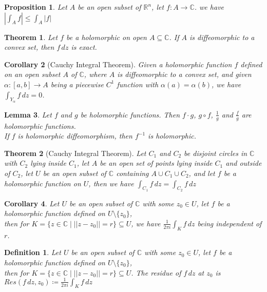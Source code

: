 \documentclass[9pt]{article}
\theoremstyle{break}
\theoremstyle{break}
\newtheorem{thm}{Theorem}[section]
\newtheorem{lem}{Lemma}[thm]
\newtheorem{prop}[lem]{Proposition}
\newtheorem{corT}[lem]{Corollary}
\newtheorem{defn}{Definition}[corL]
\newcommand{\R}{\mathbb{R}}
\newcommand{\Complex}{\mathbb{C}}
\begin{document}
\begin{prop}
Let $A$ be an open subset of $\R^n$, let $f:A \to \Complex$. we have $\left|\int_A f\right| \leq \int_A |f|$
\end{prop}

\begin{thm}
Let $f$ be a holomorphic on open $A\subseteq \Complex$. If $A$ is diffeomorphic to a convex set, then $f\, dz$ is exact.
\end{thm}

\begin{corT}[Cauchy Integral Theorem]
Given a holomorphic function $f$ defined on an open subset $A$ of $\Complex$, where $A$ is diffeomorphic to a convex set, and given $\alpha:[a,b] \to A$ being a piecewise $C^1$ function with $\alpha(a) = \alpha(b)$, we have $\int_{Y_\alpha} f\, dz = 0$.
\end{corT}

\begin{lem}
Let $f$ and $g$ be holomorphic functions. Then $f\cdot g$, $g\circ f$, $\frac{1}{g}$ and $\frac{f}{g}$ are holomorphic functions. \\
If $f$ is holomorphic diffeomorphism, then $f^{-1}$ is holomorphic.
\end{lem}

\begin{thm}[Cauchy Integral Theorem]
Let $C_1$ and $C_2$ be disjoint circles in $\Complex$ with $C_2$ lying inside $C_1$, let $A$ be an open set of points lying inside $C_1$ and outside of $C_2$, let $U$ be an open subset of $\Complex$ containing $A\cup C_1 \cup C_2$, and let $f$ be a holomorphic function on $U$, then we have $\int_{C_1} f \, dz = \int_{C_2} f\, dz$
\end{thm}

\begin{corT}
Let $U$ be an open subset of $\Complex$ with some $z_0 \in U$, let $f$ be a holomorphic function defined on $U\setminus \{z_0\}$, \\
then for $K = \{z \in \Complex \mid ||z - z_0|| = r\} \subseteq U$, we have $\frac{1}{2\pi i}\int_K f\, dz$ being independent of $r$. 
\end{corT}

\begin{defn}
Let $U$ be an open subset of $\Complex$ with some $z_0 \in U$, let $f$ be a holomorphic function defined on $U\setminus \{z_0\}$,\\ 
then for $K = \{z \in \Complex \mid ||z - z_0|| = r\} \subseteq U$. The residue of $f\, dz$ at $z_0$ is $Res(f\,dz, z_0)\coloneqq \frac{1}{2\pi i}\int_K f\, dz$
\end{defn}
\end{document}
